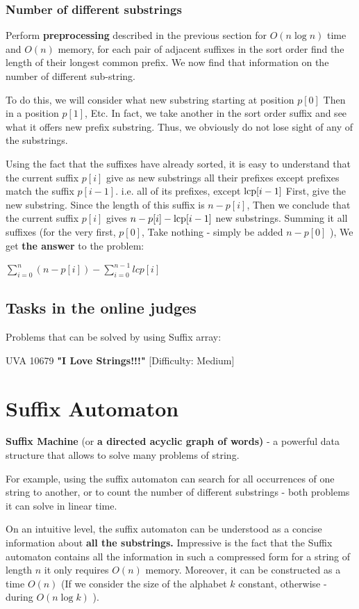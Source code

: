 \subsubsection{ Number of different substrings }

Perform \textbf{preprocessing} described in the previous section for $O (n \log n)$ time and $O (n)$ memory, for each pair of adjacent suffixes in the sort order find the length of their longest common prefix. We now find that information on the number of different sub-string.

To do this, we will consider what new substring starting at position $p [0]$ Then in a position $p [1]$, Etc. In fact, we take another in the sort order suffix and see what it offers new prefix substring. Thus, we obviously do not lose sight of any of the substrings.

Using the fact that the suffixes have already sorted, it is easy to understand that the current suffix $p [i]$ give as new substrings all their prefixes except prefixes match the suffix $p [i-1]$. i.e. all of its prefixes, except ${\rm lcp} [i-1]$ First, give the new substring. Since the length of this suffix is $n-p [i]$, Then we conclude that the current suffix $p [i]$ gives $n-p [i] - {\rm lcp} [i-1]$ new substrings. Summing it all suffixes (for the very first, $p [0]$, Take nothing - simply be added $n-p [0]$ ), We get \textbf{the answer} to the problem:

$\sum_{i=0}^{n}(n-p[i])-\sum_{i=0}^{n-1}lcp[i]$

\subsection{ Tasks in the online judges }

Problems that can be solved by using Suffix array:

UVA 10679 \textbf{"I Love Strings!!!"} [Difficulty: Medium]
\section{ Suffix Automaton }
\textbf{Suffix Machine} (or \textbf{a directed acyclic graph of words)} - a powerful data structure that allows to solve many problems of string.

For example, using the suffix automaton can search for all occurrences of one string to another, or to count the number of different substrings - both problems it can solve in linear time.

On an intuitive level, the suffix automaton can be understood as a concise information about \textbf{all the substrings.} Impressive is the fact that the Suffix automaton contains all the information in such a compressed form for a string of length $n$ it only requires $O (n)$ memory. Moreover, it can be constructed as a time $O (n)$ (If we consider the size of the alphabet $k$ constant, otherwise - during $O (n \log k)$ ).

